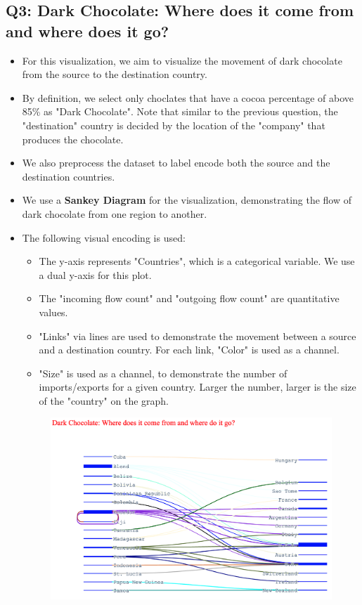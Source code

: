 \documentclass[a4paper]{article}
\begin{document}
\subsection{Q3: Dark Chocolate: Where does it come from and where does it go?}
\begin{itemize}
    \item For this visualization, we aim to visualize the movement of dark chocolate from the source to the destination country.
    \item By definition, we select only choclates that have a cocoa percentage of above 85\% as "Dark Chocolate". Note that similar to the previous question, the "destination" country is decided by the location of the "company" that produces the chocolate.
    \item We also preprocess the dataset to label encode both the source and the destination countries.
    \item We use a \textbf{Sankey Diagram} for the visualization, demonstrating the flow of dark chocolate from one region to another.
    \item The following visual encoding is used:
    \begin{itemize}
        \item The y-axis represents "Countries", which is a categorical variable. We use a dual y-axis for this plot.
        \item The "incoming flow count" and "outgoing flow count" are quantitative values.
        \item "Links" via lines are used to demonstrate the movement between a source and a destination country. For each link, "Color" is used as a channel.
        \item "Size" is used as a channel, to demonstrate the number of imports/exports for a given country. Larger the number, larger is the size of the "country" on the graph.
    \end{itemize}
    \begin{figure}[H]
        \centering
        \includegraphics[width=1.0\textwidth]{sankey}

\end{figure}
\end{itemize}
\end{document}
